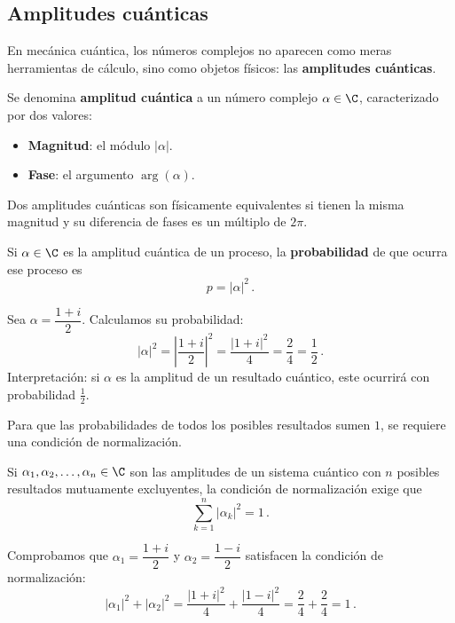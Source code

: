\subsection{Amplitudes cuánticas}

En mecánica cuántica, los números complejos no aparecen como meras herramientas de cálculo, sino como objetos físicos: las \textbf{amplitudes cuánticas}.

\begin{defi}
  Se denomina \textbf{amplitud cuántica} a un número complejo $\alpha\in\C$, caracterizado por dos valores:
  \begin{itemize}
    \item \textbf{Magnitud}: el módulo $|\alpha|$.
    \item \textbf{Fase}: el argumento $\arg(\alpha)$.
  \end{itemize}
\end{defi}

Dos amplitudes cuánticas son físicamente equivalentes si tienen la misma magnitud y su diferencia de fases es un múltiplo de $2\pi$.

\begin{defi}
  Si $\alpha\in\C$ es la amplitud cuántica de un proceso, la \textbf{probabilidad} de que ocurra ese proceso es
  \[
    p = |\alpha|^2\,.
  \]
\end{defi}

\begin{eje}
  Sea $\alpha = \dfrac{1+i}{2}$. Calculamos su probabilidad:
  \[
    |\alpha|^2 = \left|\frac{1+i}{2}\right|^2 = \frac{|1+i|^2}{4} = \frac{2}{4} = \frac{1}{2}\,.
  \]
  Interpretación: si $\alpha$ es la amplitud de un resultado cuántico, este ocurrirá con probabilidad $\frac{1}{2}$.
\end{eje}

Para que las probabilidades de todos los posibles resultados sumen $1$, se requiere una condición de normalización.

\begin{prop}
  Si $\alpha_1,\alpha_2,\ldots,\alpha_n\in\C$ son las amplitudes de un sistema cuántico con $n$ posibles resultados mutuamente excluyentes, la condición de normalización exige que
  \[
    \sum_{k=1}^n |\alpha_k|^2 = 1\,.
  \]
\end{prop}

\begin{eje}
  Comprobamos que $\alpha_1 = \dfrac{1+i}{2}$ y $\alpha_2 = \dfrac{1-i}{2}$ satisfacen la condición de normalización:
  \[
    |\alpha_1|^2 + |\alpha_2|^2 = \frac{|1+i|^2}{4} + \frac{|1-i|^2}{4} = \frac{2}{4} + \frac{2}{4} = 1\,.
  \]
\end{eje}

